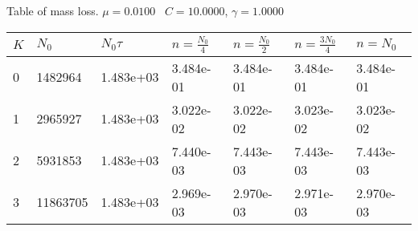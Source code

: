 \begin{center}
Table of mass loss. $\mu = 0.0100$ \, $C = 10.0000$, $\gamma = 1.0000$
  
\begin{tabular}{|p{0.8in}|p{0.8in}|p{0.8in}|p{0.8in}|p{0.8in}|p{0.8in}|p{0.8in}|} \hline
$K$ &$N_0$ &$N_0 \tau$ &$n = \frac{N_0}{4}$ &$n = \frac{N_0}{2}$ &$n = \frac{3N_0}{4}$ &$n = N_0$ \\ \hline 
0 &1482964 &1.483e+03 &3.484e-01 &3.484e-01 &3.484e-01 &3.484e-01 \\ \hline 
1 &2965927 &1.483e+03 &3.022e-02 &3.022e-02 &3.023e-02 &3.023e-02 \\ \hline 
2 &5931853 &1.483e+03 &7.440e-03 &7.443e-03 &7.443e-03 &7.443e-03 \\ \hline 
3 &11863705 &1.483e+03 &2.969e-03 &2.970e-03 &2.971e-03 &2.970e-03 \\ \hline 

\end{tabular}\\[20pt]
\end{center}
